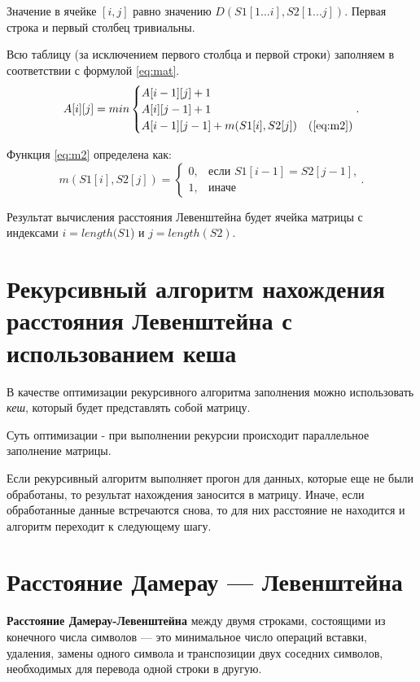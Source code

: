 Значение в ячейке $[i, j]$ равно значению $D(S1[1...i], S2[1...j])$. Первая строка и первый столбец тривиальны. 

Всю таблицу (за исключением первого столбца и первой строки) заполняем в соответствии с формулой \ref{eq:mat}.
\begin{equation}
	\label{eq:mat}
	A[i][j] = min \begin{cases}
		A[i-1][j] + 1\\
		 A[i][j-1] + 1\\
		 A[i-1][j-1] + m(S1[i], S2[j])&\text(\ref{eq:m2})\\
	 \end{cases}.
 \end{equation}

Функция \ref{eq:m2} определена как:
\begin{equation}
\label{eq:m2}
m(S1[i], S2[j]) = \begin{cases}
0, &\text{если $S1[i - 1] = S2[j - 1]$,}\\
1, &\text{иначе}
\end{cases}.
\end{equation}

Результат вычисления расстояния Левенштейна будет ячейка матрицы с индексами $i = length(S1$) и $j = length(S2)$.

\section{Рекурсивный алгоритм нахождения расстояния Левенштейна с использованием кеша}

В качестве оптимизации рекурсивного алгоритма заполнения можно использовать \textit{кеш}, который будет представлять собой матрицу.

Суть оптимизации - при выполнении рекурсии происходит параллельное заполнение матрицы.

Если рекурсивный алгоритм выполняет прогон для данных, которые еще не были обработаны, то результат нахождения заносится в матрицу. Иначе, если обработанные данные встречаются снова, то для них расстояние не находится и алгоритм переходит к следующему шагу.


\section{Расстояние Дамерау — Левенштейна}

\textbf{Расстояние Дамерау-Левенштейна} \cite{damerau-levenshtein} между двумя строками, состоящими из конечного числа символов — это минимальное число операций вставки, удаления, замены одного символа и транспозиции двух соседних символов, необходимых для перевода одной строки в другую. 

